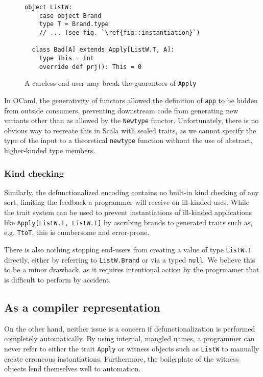 \documentclass[acmsmall,screen]{acmart}
\begin{document}
\begin{figure}[ht]
  \begin{lstlisting}[style=scala]
  object ListW:
    case object Brand
    type T = Brand.type
    // ... (see fig. `\ref{fig::instantiation}`)

  class Bad[A] extends Apply[ListW.T, A]:
    type This = Int
    override def prj(): This = 0
  \end{lstlisting}
  \caption{A careless end-user may break the guarantees of \texttt{Apply}}
  \label{fig::bad-brand}
\end{figure}

In OCaml, the generativity of functors allowed the definition of \texttt{app}
to be hidden from outside consumers, preventing downstream code from generating
new variants other than as allowed by the \texttt{Newtype} functor.
Unfortunately, there is no obvious way to recreate this in Scala with sealed
traits, as we cannot specify the type of the input to a theoretical
\texttt{newtype} function without the use of abstract, higher-kinded type
members.

\subsubsection{Kind checking}\label{sec::kinds}

Similarly, the defunctionalized encoding contains no built-in kind checking of
any sort, limiting the feedback a programmer will receive on ill-kinded uses.
While the trait system can be used to prevent instantiations of ill-kinded
applications like \texttt{Apply[ListW.T,~ListW.T]} by ascribing brands to
generated traits such as, e.g. \texttt{TtoT}, this is cumbersome and
error-prone.

There is also nothing stopping end-users from creating a value of type
\texttt{ListW.T} directly, either by referring to \texttt{ListW.Brand} or via a
typed \texttt{null}. We believe this to be a minor drawback, as it requires
intentional action by the progrmamer that is difficult to perform by accident.

\subsection{As a compiler representation}\label{sec::compiler}

On the other hand, neither issue is a concern if defunctionalization is
performed completely automatically. By using internal, mangled names, a
programmer can never refer to either the trait \texttt{Apply} or witness
objects such as \texttt{ListW} to manually create erroneous instantiations.
Furthermore, the boilerplate of the witness objects lend themselves well to
automation.
\end{document}
